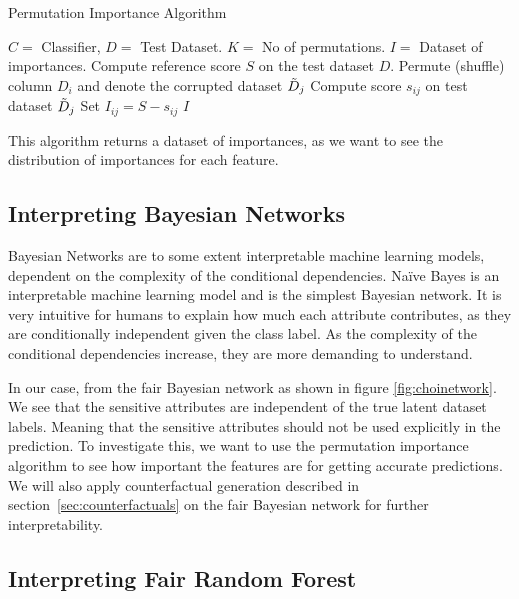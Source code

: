 \begin{algorithm}
    \caption{Permutation Importance Algorithm}
    \begin{algorithmic}
        \REQUIRE $C = $ Classifier, $D = $ Test Dataset. $K = $ No of permutations.
        \ENSURE $I = $ Dataset of importances.
        \STATE Compute reference score $S$ on the test dataset $D$.
                \STATE Permute (shuffle) column $D_{i}$ and denote the corrupted dataset $\Tilde{D}_{j}$
                \STATE Compute score $s_{ij}$ on test dataset $\Tilde{D}_{j}$
                \STATE Set $I_{ij} = S - s_{ij}$
            \ENDFOR
        \ENDFOR
        \RETURN $I$ 
    \end{algorithmic}
    \label{alg:permimp}
\end{algorithm}

This algorithm returns a dataset of importances, as we want to see the distribution of importances for each feature.

\subsection{Interpreting Bayesian Networks}

Bayesian Networks are to some extent interpretable machine learning models, dependent on the complexity of the conditional dependencies. Naïve Bayes is an interpretable machine learning model and is the simplest Bayesian network. It is very intuitive for humans to explain how much each attribute contributes, as they are conditionally independent given the class label. As the complexity of the conditional dependencies increase,  they are more demanding to understand.

In our case, from the fair Bayesian network as shown in figure \ref{fig:choinetwork}. We see that the sensitive attributes are independent of the true latent dataset labels. Meaning that the sensitive attributes should not be used explicitly in the prediction. To investigate this, we want to use the permutation importance algorithm to see how important the features are for getting accurate predictions. We will also apply counterfactual generation described in section~\ref{sec:counterfactuals} on the fair Bayesian network for further interpretability.

\subsection{Interpreting Fair Random Forest}

